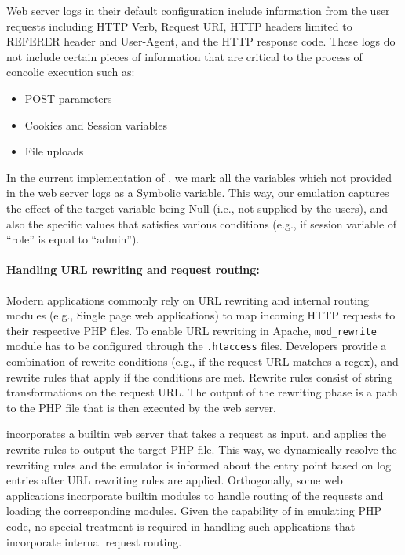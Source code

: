 Web server logs in their default configuration include information from the user requests including HTTP Verb, Request URI, HTTP headers limited to REFERER header and User-Agent, and the HTTP response code. 
These logs do not include certain pieces of information that are critical to the process of concolic execution such as:

\begin{itemize}
    \item POST parameters
    \item Cookies and Session variables
    \item File uploads
\end{itemize}

In the current implementation of \animatedead{}, we mark all the variables which not provided in the web server logs as a Symbolic variable. 
This way, our emulation captures the effect of the target variable being Null (i.e., not supplied by the users), and also the specific values that satisfies various conditions (e.g., if session variable of ``role'' is equal to ``admin''). 

\paragraph{Handling URL rewriting and request routing:} 

Modern applications commonly rely on URL rewriting and internal routing modules (e.g., Single page web applications) to map incoming HTTP requests to their respective PHP files. 
To enable URL rewriting in Apache, \texttt{mod\_rewrite} module has to be configured through the \texttt{.htaccess} files. 
Developers provide a combination of rewrite conditions (e.g., if the request URL matches a regex), and rewrite rules that apply if the conditions are met. 
Rewrite rules consist of string transformations on the request URL. 
The output of the rewriting phase is a path to the PHP file that is then executed by the web server. 

\animatedead{} incorporates a builtin web server that takes a request as input, and applies the rewrite rules to output the target PHP file. 
This way, we dynamically resolve the rewriting rules and the emulator is informed about the entry point based on log entries after URL rewriting rules are applied. 
Orthogonally, some web applications incorporate builtin modules to handle routing of the requests and loading the corresponding modules. 
Given the capability of \animatedead{} in emulating PHP code, no special treatment is required in handling such applications that incorporate internal request routing. 

